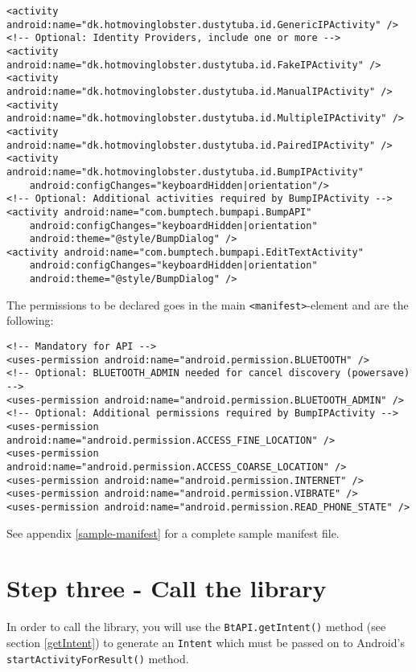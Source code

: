 \documentclass[a4paper,11pt]{article}
\begin{document}
\footnotesize
\begin{verbatim}
<activity android:name="dk.hotmovinglobster.dustytuba.id.GenericIPActivity" />
<!-- Optional: Identity Providers, include one or more -->
<activity android:name="dk.hotmovinglobster.dustytuba.id.FakeIPActivity" />
<activity android:name="dk.hotmovinglobster.dustytuba.id.ManualIPActivity" />
<activity android:name="dk.hotmovinglobster.dustytuba.id.MultipleIPActivity" />
<activity android:name="dk.hotmovinglobster.dustytuba.id.PairedIPActivity" />
<activity android:name="dk.hotmovinglobster.dustytuba.id.BumpIPActivity"
    android:configChanges="keyboardHidden|orientation"/>
<!-- Optional: Additional activities required by BumpIPActivity -->
<activity android:name="com.bumptech.bumpapi.BumpAPI"
    android:configChanges="keyboardHidden|orientation"
    android:theme="@style/BumpDialog" />
<activity android:name="com.bumptech.bumpapi.EditTextActivity"
    android:configChanges="keyboardHidden|orientation"
    android:theme="@style/BumpDialog" />
\end{verbatim}
\normalsize

The permissions to be declared goes in the main \verb+<manifest>+-element and are the following:

\footnotesize
\begin{verbatim}
<!-- Mandatory for API -->
<uses-permission android:name="android.permission.BLUETOOTH" />
<!-- Optional: BLUETOOTH_ADMIN needed for cancel discovery (powersave) -->
<uses-permission android:name="android.permission.BLUETOOTH_ADMIN" />
<!-- Optional: Additional permissions required by BumpIPActivity -->
<uses-permission android:name="android.permission.ACCESS_FINE_LOCATION" />
<uses-permission android:name="android.permission.ACCESS_COARSE_LOCATION" />
<uses-permission android:name="android.permission.INTERNET" />
<uses-permission android:name="android.permission.VIBRATE" />
<uses-permission android:name="android.permission.READ_PHONE_STATE" />
\end{verbatim}
\normalsize

See appendix \ref{sample-manifest} for a complete sample manifest file.

\clearpage


\section{Step three - Call the library}
\label{stepthree}
In order to call the library, you will use the \verb+BtAPI.getIntent()+ method (see section \ref{getIntent}) to generate an \verb+Intent+ which must be passed on to Android's \verb+startActivityForResult()+ method.
\end{document}
